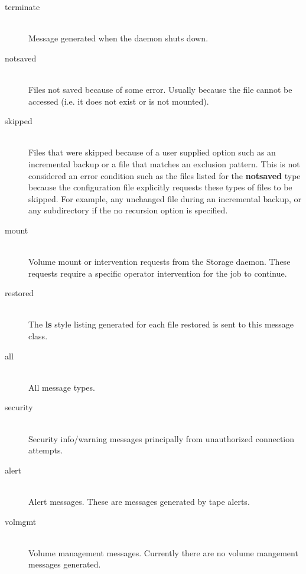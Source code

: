\begin{description}
\begin{description}
\item [terminate] \hfill \\
Message generated when the daemon shuts down.

\item [notsaved] \hfill \\
Files not saved because of some error.  Usually because the file cannot be
accessed (i.e. it does not  exist or is not mounted).

\item [skipped] \hfill \\
Files that were skipped because of a user supplied option such as an
incremental backup or a file that matches an exclusion pattern.  This is
not considered an error condition such as the files listed for the {\bf
notsaved} type because the configuration file explicitly requests these
types of files to be skipped.  For example, any unchanged file during an
incremental backup, or any subdirectory if the no recursion option is
specified.

\item [mount] \hfill \\
Volume mount or intervention requests from the Storage daemon.  These
requests require a specific operator intervention for the job to
continue.

\item [restored] \hfill \\
The {\bf ls} style listing generated for each file restored is sent to
this message class.

\item [all] \hfill \\
All message types.

\item [security] \hfill \\
Security info/warning messages principally from unauthorized
connection attempts.

\item [alert] \hfill \\
Alert messages. These are messages generated by tape alerts.

\item [volmgmt] \hfill \\
Volume management messages. Currently there are no volume mangement
messages generated.
\end{description}

\end{description}

